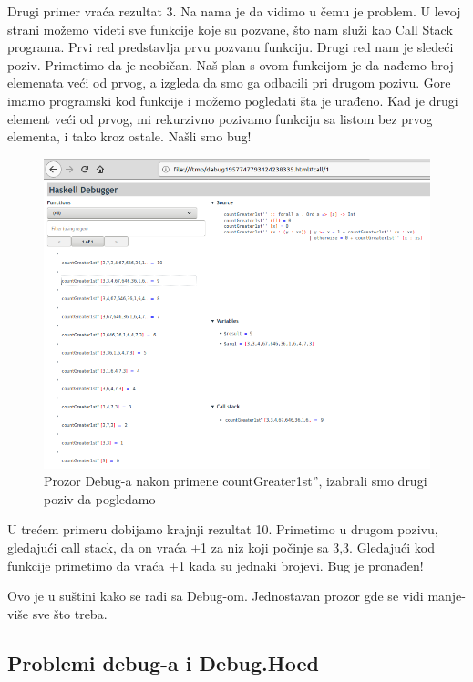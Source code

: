 \documentclass[a4paper]{article}
\begin{document}
{{Drugi primer vraća rezultat 3. Na nama je da vidimo u čemu je problem. U levoj strani možemo videti sve funkcije koje su pozvane, što nam služi kao Call Stack programa. Prvi red predstavlja prvu pozvanu funkciju. Drugi red nam je sledeći poziv. Primetimo da je neobičan. Naš plan s ovom funkcijom je da nađemo broj elemenata veći od prvog, a izgleda da smo ga odbacili pri drugom pozivu.
Gore imamo programski kod funkcije i možemo pogledati šta je urađeno.
Kad je drugi element veći od prvog, mi rekurzivno pozivamo funkciju sa listom bez prvog elementa, i tako kroz ostale. Našli smo bug!

\begin{figure}[h!]
\begin{center}
\includegraphics[scale=0.3]{mitchell-browser-pregled''.png}
\caption{Prozor Debug-a nakon primene countGreater1st'', izabrali smo drugi poziv da pogledamo}
\end{center}
\end{figure}

U trećem primeru dobijamo krajnji rezultat 10. Primetimo u drugom pozivu, gledajući call stack, da on vraća +1 za niz koji počinje sa 3,3. Gledajući kod funkcije primetimo da vraća +1 kada su jednaki brojevi. Bug je pronađen!

Ovo je u suštini kako se radi sa Debug-om. Jednostavan prozor gde se vidi manje-više sve što treba.
\subsection{Problemi debug-a i Debug.Hoed}

}}
\end{document}
